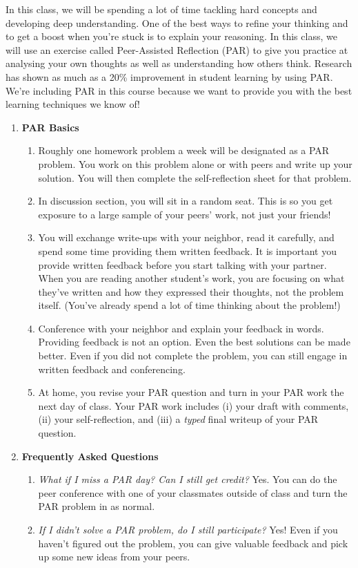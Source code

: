 \documentclass[letter]{article}
\newcommand{\setheader}[6]{
	\lhead{{\sc #1}\\{\sc #2} ({\small \it \today})}
	\rhead{
		{\bf #3} 
		\ifthenelse{\equal{#4}{}}{}{(#4)}\\
		{\bf #5} 
		\ifthenelse{\equal{#6}{}}{}{(#6)}%
	}
}
\begin{document}
	\setheader{Math 240}{PAR Instructions}{$\phantom{x}$}{}{}{}
	In this class, we will be spending a lot of time tackling hard concepts
	and developing deep understanding.  One of the best ways to refine
	your thinking and to get a boost when you're stuck is to explain
	your reasoning.  In this class, we will use an exercise called Peer-Assisted
	Reflection (PAR) to give you practice at analysing your own thoughts
	as well as understanding how others think.  Research has shown
	as much as a 20\% improvement in student learning by using PAR.  We're
	including PAR in this course because we want
	to provide you with the best learning techniques we know of!

	\begin{enumerate}
		\item {\bf PAR Basics}
			\begin{enumerate}
				\item Roughly one homework problem a week will be designated as a PAR problem.
					You work on this problem alone or with peers and write up your solution.
					You will then complete the self-reflection sheet for that problem.
				\item In discussion section, you will sit in a random seat.
					This is so you get exposure to a large sample of your peers' work, not just your friends!
				\item You will exchange write-ups with your neighbor, read it carefully, and spend some time providing
					them written feedback.  
					It is important you provide written feedback before you start talking with your partner.
					When you are reading another
					student's work, you are focusing on what they've written
					and how they expressed their thoughts, not the problem itself.
					(You've already spend a lot of time thinking about the problem!)
				\item Conference with your neighbor and explain
					your feedback in words.
					Providing feedback is not an option. Even the best solutions 
					can be made better. Even if you did not complete the problem,
					you can still engage in written feedback and conferencing.
				\item At home, you revise your PAR question and turn in 
					your PAR work the next day of class.  Your PAR work includes
					(i) your draft with comments, (ii) your self-reflection, and
					(iii) a \emph{typed} final writeup of your PAR question.
			\end{enumerate}
		\item {\bf Frequently Asked Questions}
			\begin{enumerate}
				\item {\it What if I miss a PAR day? Can I still get credit?}
				Yes. You can do the peer
				conference with one of your classmates outside of class and turn the PAR problem in as normal.
				\item {\it If I didn't solve a PAR problem, do I still participate?}  Yes!  Even
					if you haven't figured out the problem, you can give valuable feedback and
					pick up some new ideas from your peers.
			\end{enumerate}
	\end{enumerate}
\end{document}
